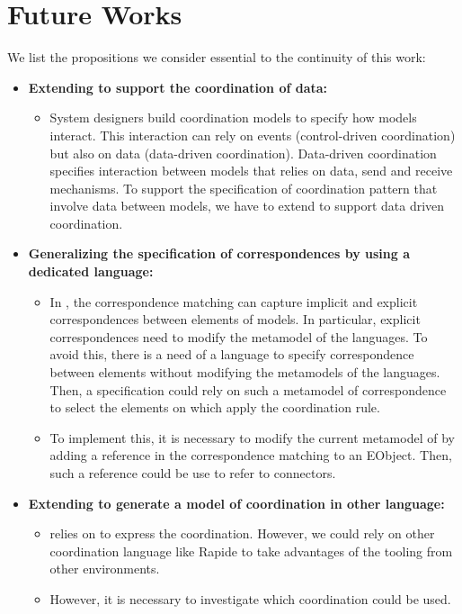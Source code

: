\section{Future Works}

We list the propositions we consider essential to the continuity of this work:

\begin{itemize}
	\item \textbf{Extending \bcool to support the coordination of data:} 
	\begin{itemize}
		\item System designers build coordination models to specify how models interact. This interaction can rely on events (\ie control-driven coordination) but also on data (\ie data-driven coordination). Data-driven coordination specifies interaction between models that relies on data, \eg send and receive mechanisms. To support the specification of coordination pattern that involve data between models, we have to extend \bcool to support data driven coordination.
	
	\end{itemize}
	
	\item \textbf{Generalizing the specification of correspondences by using a dedicated language:}
		\begin{itemize}
			\item In \bcool, the correspondence matching can capture implicit and explicit correspondences between elements of models. In particular, explicit correspondences need to modify the metamodel of the languages. To avoid this, there is a need of a language to specify correspondence between elements without modifying the metamodels of the languages. Then, a \bcool specification could rely on such a metamodel of correspondence to select the elements on which apply the coordination rule. 
			\item To implement this, it is necessary to modify the current metamodel of \bcool by adding a reference in the correspondence matching to an EObject. Then, such a reference could be use to refer to connectors. 
		\end{itemize}
			\item \textbf{Extending \bcool to generate a model of coordination in other language:} 
			\begin{itemize}
				\item \bcool relies on \ccsl to express the coordination. However, we could rely on other coordination language like Rapide to take advantages of the tooling from other environments.
				\item However, it is necessary to investigate which coordination could be used.         
			\end{itemize}
\end{itemize}
